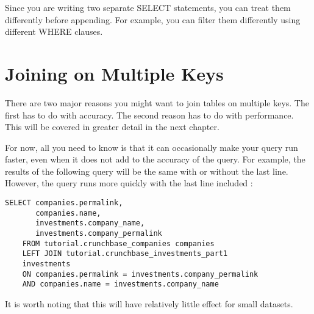 \documentclass[12pt, letterpaper]{article}
\begin{document}
Since you are writing two separate SELECT statements, you can treat them differently before appending. For example, you can filter them differently using different WHERE clauses.


\section{Joining on Multiple Keys}
There are two major reasons you might want to join tables on multiple keys. The first has to do with accuracy. The second reason has to do with performance. This will be covered in greater detail in the next chapter. 

For now, all you need to know is that it can occasionally make your query run faster, even when it does not add to the accuracy of the query. For example, the results of the following query will be the same with or without the last line. However, the query runs more quickly with the last line included : 

\begin{verbatim}
SELECT companies.permalink,
       companies.name,
       investments.company_name,
       investments.company_permalink
    FROM tutorial.crunchbase_companies companies
    LEFT JOIN tutorial.crunchbase_investments_part1 
    investments
    ON companies.permalink = investments.company_permalink
    AND companies.name = investments.company_name
\end{verbatim}

It is worth noting that this will have relatively little effect for small datasets.
\end{document}
